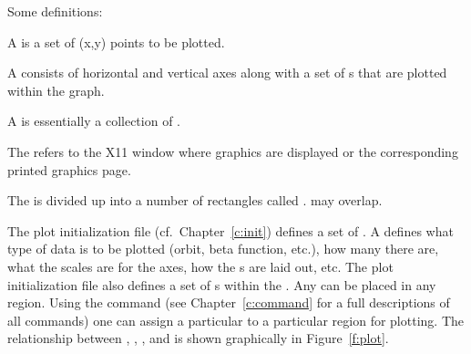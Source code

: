 Some definitions:
  \vspace*{-3ex}
\begin{description}
\item[Curve] \Newline
A  is a set of (x,y) points to be plotted.
\item[Graph] \Newline
A  consists of horizontal and vertical axes along with a set
of s that are plotted within the graph. 
\item[Plot] \Newline
A  is essentially a collection of .
\item[Page] \Newline
The  refers to the X11 window where graphics are displayed or the 
corresponding printed graphics page.
\item[Region] \Newline
The  is divided up into a number of rectangles called
.  may overlap.
\end{description}

The plot initialization file (cf.~Chapter~\ref{c:init}) defines a set
of . A  defines what type of data is
to be plotted (orbit, beta function, etc.), how many  there are,
what the scales are for the  axes, how the s are
laid out, etc.  The plot initialization file also defines a set of
s within the . Any  can be
placed in any region. Using the  command (see
Chapter~\ref{c:command} for a full descriptions of all commands) one
can assign a particular  to a particular region for
plotting.  The relationship between , ,
, and  is shown graphically in
Figure~\ref{f:plot}.


